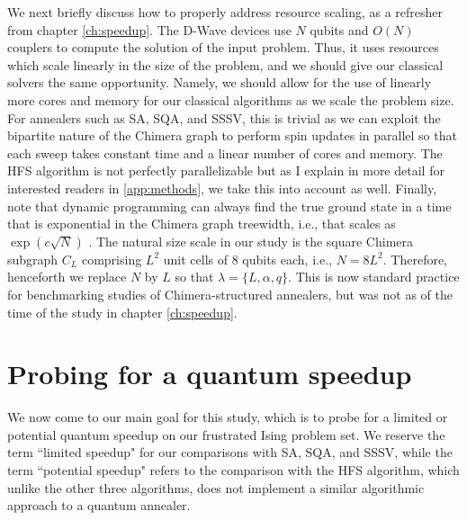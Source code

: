 We next briefly discuss how to properly address resource scaling, as a refresher from chapter \ref{ch:speedup}. The D-Wave devices use $N$ qubits and $O(N)$ couplers to compute the solution of the input problem. Thus, it uses resources which scale linearly in the size of the problem, and we should give our classical solvers the same opportunity. Namely, we should allow for the use of linearly more cores and memory for our classical algorithms as we scale the problem size.
For annealers such as SA, SQA, and SSSV, this is trivial as we can exploit the bipartite nature of the Chimera graph to perform spin updates in parallel so that each sweep takes constant time and a linear number of cores and memory.
The HFS algorithm is not perfectly parallelizable but as I explain in more detail for interested readers in \ref{app:methods}, we take this into account as well. Finally, note that dynamic programming can always find the true ground state in a time that is exponential in the Chimera graph treewidth, i.e., that scales as $\exp(c\sqrt{N})$ \cite{Choi2}. The natural size scale in our study is the square Chimera subgraph $C_L$ comprising $L^2$ unit cells of $8$ qubits each, i.e., $N = 8L^2$. Therefore, henceforth we replace $N$ by $L$ so that $\lambda = \{L,\alpha,q\}$. This is now standard practice for benchmarking studies of Chimera-structured annealers, but was not as of the time of the study in chapter \ref{ch:speedup}.


\section{Probing for a quantum speedup}
We now come to our main goal for this study, which is to probe for a limited or potential quantum speedup on our frustrated Ising problem set. We reserve the term ``limited speedup" for our comparisons with SA, SQA, and SSSV, while the term ``potential speedup" refers to the comparison with the HFS algorithm, which unlike the other three algorithms, does not implement a similar algorithmic approach to a quantum annealer.

